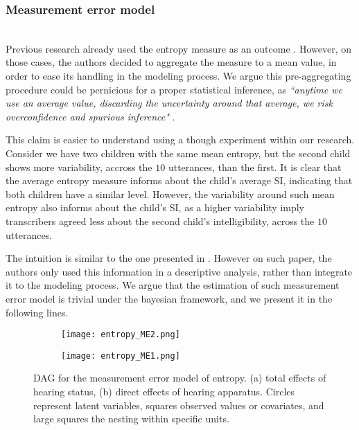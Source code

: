 \subsubsection{Measurement error model} \\
%
Previous research already used the entropy measure as an outcome \citep{Boonen_et_al_2021, Faes_et_al_2021}. However, on those cases, the authors decided to aggregate the measure to a mean value, in order to ease its handling in the modeling process. We argue this pre-aggregating procedure could be pernicious for a proper statistical inference, as \textit{``anytime we use an average value, discarding the uncertainty around that average, we risk overconfidence and spurious inference"} \citep{McElreath_2020}. 

This claim is easier to understand using a though experiment within our research.  Consider we have two children with the same mean entropy, but the second child shows more variability, accross the $10$ utterances, than the first. It is clear that the average entropy measure informs about the child's average SI, indicating that both children have a similar level. However, the variability around such mean entropy also informs about the child's SI, as a higher variability imply transcribers agreed less about the second child's intelligibility, across the $10$ utterances. 

The intuition is similar to the one presented in \citet{Boonen_et_al_2021}. However on such paper, the authors only used this information in a descriptive analysis, rather than integrate it to the modeling process. We argue that the estimation of such measurement error model is trivial under the bayesian framework, and we present it in the following lines.
%
\begin{figure}[h]
	\centering
	\begin{subfigure}{0.4\textwidth}
		\centering
		\texttt{[image: entropy\_ME2.png]}
		\caption{}
	\end{subfigure}
	\hfill
	\begin{subfigure}{0.5\textwidth}
		\centering
		\texttt{[image: entropy\_ME1.png]}
		\caption{}
	\end{subfigure}
	\caption[DAG for the measurement error model of entropy.]%
	{DAG for the measurement error model of entropy. (a) total effects of hearing status, (b) direct effects of hearing apparatus. Circles represent latent variables, squares observed values or covariates, and large squares the nesting within specific units.}
	\label{fig:entropy_ME}
\end{figure}
%

